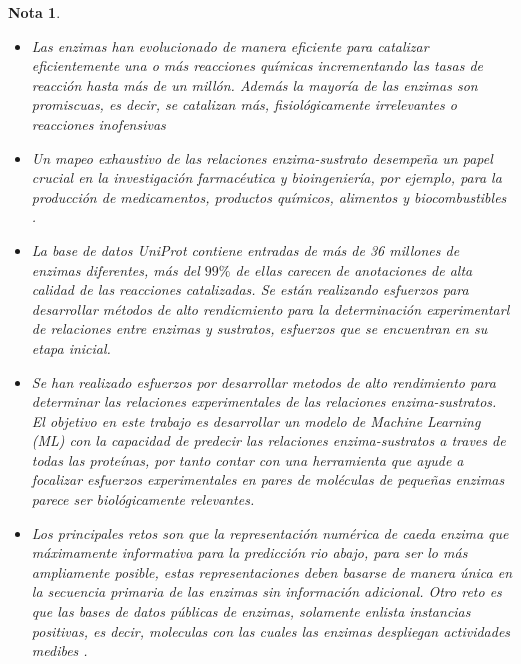 \documentclass[12pt]{article}
\newtheorem{Note}{Nota}%
\begin{document}
\begin{Note}
\begin{itemize}
\item Las enzimas han evolucionado de manera eficiente para catalizar eficientemente una o más reacciones químicas incrementando las tasas de reacción hasta más de un millón. Además la mayoría de las enzimas son promiscuas, es decir, se catalizan más, fisiológicamente irrelevantes o reacciones inofensivas \cite{2.2, 2.4}

\item Un mapeo exhaustivo de las relaciones enzima-sustrato desempeña un papel crucial en la investigación farmacéutica y bioingeniería, por ejemplo, para la producción de medicamentos, productos químicos, alimentos y biocombustibles \cite{2.5, 2.6,2.7}.


\item La base de datos UniProt contiene entradas de más de 36 millones de enzimas diferentes, más del $99\%$ de ellas carecen de anotaciones de alta calidad de las reacciones catalizadas. Se están realizando esfuerzos para desarrollar métodos de alto rendicmiento para la determinación experimentarl de relaciones entre enzimas y sustratos, esfuerzos que se encuentran en su etapa inicial\cite{2.9,2.10,2.11}.


\item Se han realizado esfuerzos por desarrollar metodos de alto rendimiento para determinar las relaciones experimentales de las relaciones enzima-sustratos. El objetivo en este trabajo es desarrollar un modelo de Machine Learning (ML) con la capacidad de predecir las relaciones enzima-sustratos a traves de todas las proteínas, por tanto contar con una herramienta que ayude a focalizar esfuerzos experimentales en pares de moléculas de pequeñas enzimas parece ser biológicamente relevantes. 

\item Los principales retos son que la representación numérica de caeda enzima que máximamente informativa para la predicción rio abajo, para ser lo más ampliamente posible, estas representaciones deben basarse de manera única en la secuencia primaria de las enzimas sin información adicional. Otro reto es que las bases de datos públicas de enzimas, solamente enlista instancias positivas, es decir, moleculas con las cuales las enzimas despliegan actividades medibes \cite{2.13}. 

\end{itemize}
\end{Note}
\end{document}
